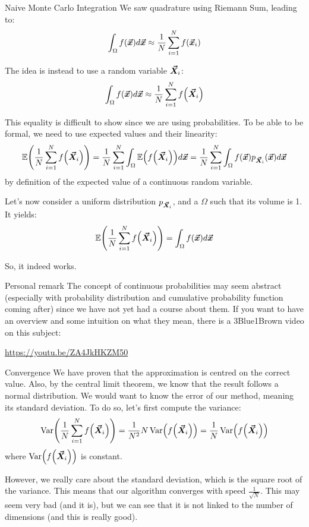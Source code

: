 \documentclass[a4paper]{article}
\begin{document}
\begin{parag}{Naive Monte Carlo Integration}
    We saw quadrature using Riemann Sum, leading to: 
    \[\int_{\Omega} f\left(\bvec{x}\right) d \bvec{x} \approx \frac{1}{N} \sum_{i=1}^{N} f\left(\bvec{x}_i\right)\]
    
    The idea is instead to use a random variable $\bm{\protect\vec{X}}_i$: 
    \[\int_{\Omega} f\left(\bvec{x}\right) d \bvec{x} \approx \frac{1}{N} \sum_{i=1}^{N} f\left(\bvec{X}_i\right)\]
    
    This equality is difficult to show since we are using probabilities. To be able to be formal, we need to use expected values and their linearity: 
    \[\exval\left(\frac{1}{N} \sum_{i=1}^{N} f\left(\bvec{X}_i\right)\right) = \frac{1}{N} \sum_{i=1}^{N} \int_{\Omega} \exval\left(f\left(\bvec{X}_i\right)\right) d \bvec{x} = \frac{1}{N} \sum_{i=1}^{N} \int_{\Omega} f\left(\bvec{x}\right)p_{\bvec{X}_i}\left(\bvec{x}\right) d \bvec{x}\]
    by definition of the expected value of a continuous random variable.

    Let's now consider a uniform distribution $p_{\bm{\protect\vec{X}}_i}$, and a $\Omega$ such that its volume is 1. It yields: 
    \[\exval\left(\frac{1}{N} \sum_{i=1}^{N} f\left(\bvec{X}_i\right)\right) = \int_{\Omega} f\left(\bvec{x}\right) d \bvec{x}\]
    
    So, it indeed works.

    \begin{subparag}{Personal remark}
        The concept of continuous probabilities may seem abstract (especially with probability distribution and cumulative probability function coming after) since we have not yet had a course about them. If you want to have an overview and some intuition on what they mean, there is a 3Blue1Brown video on this subject:
        \begin{center}
            \url{https://youtu.be/ZA4JkHKZM50}
        \end{center}
    \end{subparag}
\end{parag}

\begin{parag}{Convergence}
    We have proven that the approximation is centred on the correct value. Also, by the central limit theorem, we know that the result follows a normal distribution. We would want to know the error of our method, meaning its standard deviation. To do so, let's first compute the variance:
    \[\Var\left(\frac{1}{N} \sum_{i=1}^{N} f\left(\bvec{X}_i\right) \right) = \frac{1}{N^2} N \Var\left(f\left(\bvec{X}_i\right)\right) = \frac{1}{N} \Var\left(f\left(\bvec{X}_i\right)\right)\]
    where $\Var\left(f\left(\bvec{X}_i\right)\right)$ is constant.

    However, we really care about the standard deviation, which is the square root of the variance. This means that our algorithm converges with speed $\frac{1}{\sqrt{N}}$. This may seem very bad (and it is), but we can see that it is not linked to the number of dimensions (and this is really good).
\end{parag}
\end{document}
